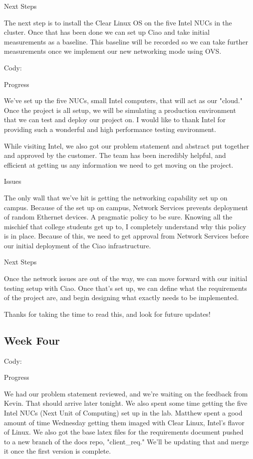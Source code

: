 \documentclass[10pt,onecolumn,journal,draftclsnofoot]{IEEEtran}
\begin{document}
Next Steps

The next step is to install the Clear Linux OS on the five Intel NUCs in the
cluster. Once that has been done we can set up Ciao and take initial
measurements as a baseline. This baseline will be recorded so we can take
further measurements once we implement our new networking mode using OVS.

Cody:

Progress

We've set up the five NUCs, small Intel computers, that will act as our "cloud."
Once the project is all setup, we will be simulating a production environment
that we can test and deploy our project on. I would like to thank Intel for
providing such a wonderful and high performance testing environment.

While visiting Intel, we also got our problem statement and abstract put
together and approved by the customer. The team has been incredibly helpful, and
efficient at getting us any information we need to get moving on the project.

Issues

The only wall that we've hit is getting the networking capability set up on
campus. Because of the set up on campus, Network Services prevents deployment of
random Ethernet devices. A pragmatic policy to be sure. Knowing all the mischief
that college students get up to, I completely understand why this policy is in
place. Because of this, we need to get approval from Network Services before our
initial deployment of the Ciao infrastructure.

Next Steps

Once the network issues are out of the way, we can move forward with our initial
testing setup with Ciao. Once that's set up, we can define what the requirements
of the project are, and begin designing what exactly needs to be implemented.

Thanks for taking the time to read this, and look for future updates!

\subsection{Week Four}

Cody:

Progress

We had our problem statement reviewed, and we're waiting on the feedback from
Kevin. That should arrive later tonight. We also spent some time getting the
five Intel NUCs (Next Unit of Computing) set up in the lab. Matthew spent a good
amount of time Wednesday getting them imaged with Clear Linux, Intel's flavor of
Linux. We also got the base latex files for the requirements document pushed to
a new branch of the docs repo, "client\_req." We'll be updating that and merge it
once the first version is complete.
\end{document}
